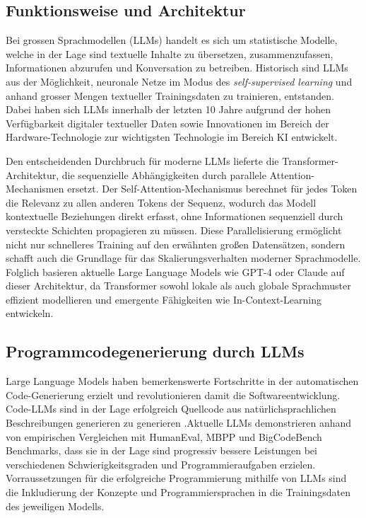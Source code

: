 \subsection{Funktionsweise und Architektur}
Bei grossen Sprachmodellen (LLMs) handelt es sich um statistische Modelle,
welche in der Lage sind textuelle Inhalte zu übersetzen, zusammenzufassen,
Informationen abzurufen und Konversation zu betreiben. Historisch sind LLMs aus
der Möglichkeit, neuronale Netze im Modus des \textit{self-supervised learning}
und anhand grosser Mengen textueller Trainingsdaten zu trainieren, entstanden.
Dabei haben sich LLMs innerhalb der letzten 10 Jahre aufgrund der hohen Verfügbarkeit digitaler
textueller Daten sowie Innovationen im Bereich der Hardware-Technologie zur
wichtigsten Technologie im Bereich KI entwickelt. 


Den entscheidenden Durchbruch für moderne LLMs lieferte die
Transformer-Architektur, die sequenzielle Abhängigkeiten durch parallele
Attention-Mechanismen ersetzt. Der Self-Attention-Mechanismus berechnet für
jedes Token die Relevanz zu allen anderen Tokens der Sequenz, wodurch das Modell
kontextuelle Beziehungen direkt erfasst, ohne Informationen sequenziell durch
versteckte Schichten propagieren zu müssen. Diese Parallelisierung ermöglicht
nicht nur schnelleres Training auf den erwähnten großen Datensätzen, sondern
schafft auch die Grundlage für das Skalierungsverhalten moderner Sprachmodelle.
Folglich basieren aktuelle Large Language Models wie GPT-4 oder Claude auf
dieser Architektur, da Transformer sowohl lokale als auch globale Sprachmuster
effizient modellieren und emergente Fähigkeiten wie In-Context-Learning
entwickeln.

\subsection{Programmcodegenerierung durch LLMs}%
Large Language Models haben bemerkenswerte Fortschritte in der automatischen
Code-Generierung erzielt und revolutionieren damit die Softwareentwicklung.
Code-LLMs sind in der Lage erfolgreich Quellcode aus natürlichsprachlichen
Beschreibungen generieren zu generieren .Aktuelle LLMs demonstrieren anhand von
empirischen Vergleichen mit HumanEval, MBPP und BigCodeBench Benchmarks, dass
sie in der Lage sind progressiv bessere Leistungen bei verschiedenen
Schwierigkeitsgraden und Programmieraufgaben erzielen. 
Vorraussetzungen für die erfolgreiche Programmierung mithilfe von LLMs sind die
Inkludierung der Konzepte und Programmiersprachen in die Trainingsdaten des
jeweiligen Modells.

